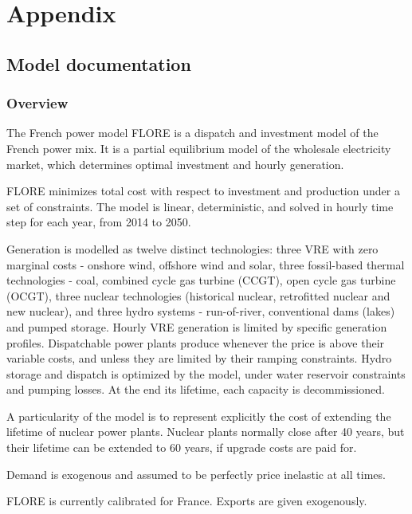 \section*{Appendix}


\subsection{Model documentation}

\subsubsection{Overview}
The French power model FLORE is a dispatch and investment model of the French power mix. It is a partial equilibrium model of the wholesale electricity market, which determines optimal investment and hourly generation.

FLORE minimizes total cost with respect to investment and production under a set of constraints. The model is linear, deterministic, and solved in hourly time step for each year, from 2014 to 2050.

Generation is modelled as twelve distinct technologies: three VRE with zero marginal costs - onshore wind, offshore wind and solar, three fossil-based thermal technologies - coal, combined cycle gas turbine (CCGT), open cycle gas turbine (OCGT), three nuclear technologies (historical nuclear, retrofitted nuclear and new nuclear), and three hydro systems - run-of-river, conventional dams (lakes) and pumped storage. 
Hourly VRE generation is limited by specific generation profiles.
Dispatchable power plants produce whenever the price is above their variable costs, and unless they are limited by their ramping constraints.
Hydro storage and dispatch is optimized by the model, under water reservoir constraints and pumping losses.
At the end its lifetime, each capacity is decommissioned.

A particularity of the model is to represent explicitly the cost of extending the lifetime of nuclear power plants. Nuclear plants normally close after 40 years, but their lifetime can be extended to 60 years, if upgrade costs are paid for.

Demand is exogenous and assumed to be perfectly price inelastic at all times.

FLORE is currently calibrated for France. Exports are given exogenously.


